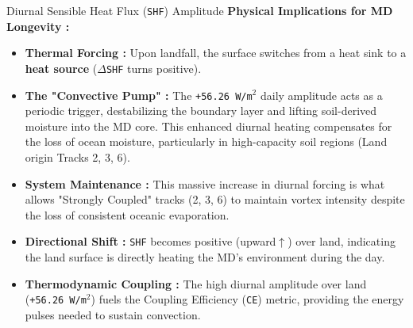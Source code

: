 \documentclass[8pt, aspectratio=169]{beamer}
\begin{document}
\begin{frame}{Diurnal Sensible Heat Flux (\texttt{SHF}) Amplitude}
    \vspace{0.6cm}
    \footnotesize
    \textbf{Physical Implications for MD Longevity :}
    \begin{itemize}
        \item \textbf{Thermal Forcing :} Upon landfall, the surface switches from a heat sink to a \textbf{heat source} (\texttt{\(\Delta\)SHF} turns positive).
        \item \textbf{The "Convective Pump" :} The \texttt{+56.26 W/m$^2$} daily amplitude acts as a periodic trigger, destabilizing the boundary layer and lifting soil-derived moisture into the MD core. This enhanced diurnal heating compensates for the loss of ocean moisture, particularly in high-capacity soil regions (Land origin Tracks 2, 3, 6).
        \item \textbf{System Maintenance :} This massive increase in diurnal forcing is what allows "Strongly Coupled" tracks (2, 3, 6) to maintain vortex intensity despite the loss of consistent oceanic evaporation.
        \item \textbf{Directional Shift :} \texttt{SHF} becomes positive (upward$\uparrow$) over land, indicating the land surface is directly heating the MD's environment during the day.
        \item \textbf{Thermodynamic Coupling :} The high diurnal amplitude over land (\texttt{+56.26 W/m$^2$}) fuels the Coupling Efficiency (\texttt{CE}) metric, providing the energy pulses needed to sustain convection.
    \end{itemize}
\end{frame}
\end{document}
